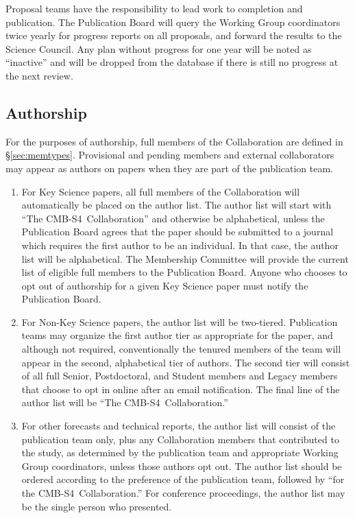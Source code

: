 \documentclass[12pt]{article}
\newcommand\collabname{CMB-S4}
\begin{document}
Proposal teams have the responsibility to lead work to completion and publication. The Publication Board will query the Working Group coordinators twice yearly for progress reports on all proposals, and forward the results to the Science Council. Any plan without progress for one year will be noted as ``inactive'' and will be dropped from the database if there is still no progress at the next review.

\subsection{Authorship}

For the purposes of authorship, full members of the Collaboration are defined in \S\ref{sec:memtypes}.  Provisional and pending members and external collaborators may appear as authors on papers when they are part of the publication team.

\begin{enumerate}

\item For Key Science papers, all full members of the Collaboration will automatically be placed on the author list. The author list will start with ``The \collabname\ Collaboration'' and otherwise be alphabetical, unless the Publication Board agrees that the paper should be submitted to a journal which requires the first author to be an individual. In that case, the author list will be alphabetical. The Membership Committee will provide the current list of eligible  full members to the Publication Board. Anyone who chooses to opt out of authorship for a given Key Science paper must notify the Publication Board.

\item For Non-Key Science papers, the author list will be two-tiered. Publication teams may organize the first author tier as appropriate for the paper, and although not required, conventionally the tenured members of the team will appear in the second, alphabetical tier of authors. The second tier will consist of all  full Senior, Postdoctoral, and Student members and Legacy members that choose to opt in online after an email notification.  The final line of the author list will be ``The \collabname\ Collaboration.''

\item For other forecasts and technical reports, the author list will consist of the publication team only, plus any Collaboration members that contributed to the study, as determined by the publication team and appropriate Working Group coordinators, unless those authors opt out. The author list should be ordered according to the preference of the publication team, followed by ``for the \collabname\ Collaboration.''  For conference proceedings, the author list may be the single person who presented.

\end{enumerate}
\end{document}
